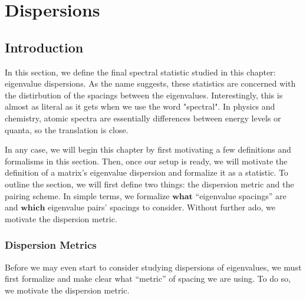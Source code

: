 
\chapter{Dispersions}

\section{Introduction}

In this section, we define the final spectral statistic studied in this chapter: eigenvalue dispersions. As the name suggests, these statistics are concerned with the distirbution of the spacings between the eigenvalues. Interestingly, this is almost as literal as it gets when we use the word "spectral". In physics and chemistry, atomic spectra are essentially differences between energy levels or quanta, so the translation is close. 

In any case, we will begin this chapter by first motivating a few definitions and formalisms in this section. Then, once our setup is ready, we will motivate the definition of a matrix's eigenvalue dispersion and formalize it as a statistic. To outline the section, we will first define two things: the dispersion metric and the pairing scheme. In simple terms, we formalize $\textbf{what}$ ``eigenvalue spacings'' are and $\textbf{which}$ eigenvalue pairs' spacings to consider. Without further ado, we motivate the dispersion metric.


\subsection{Dispersion Metrics}

Before we may even start to consider studying dispersions of eigenvalues, we must first formalize and make clear what ``metric'' of spacing we are using. To do so, we motivate the dispersion metric.

